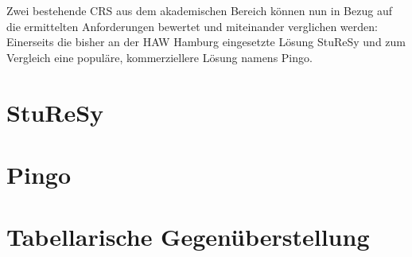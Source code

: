 Zwei bestehende CRS aus dem akademischen Bereich können nun in Bezug auf die ermittelten Anforderungen bewertet und miteinander verglichen werden: Einerseits die bisher an der HAW Hamburg eingesetzte Lösung StuReSy und zum Vergleich eine populäre, kommerziellere Lösung namens Pingo.

\section{StuReSy}
\label{chap:sturesy}


\newpage
\section{Pingo}
\label{chap:pingo}


\newpage
\section{Tabellarische Gegenüberstellung}
\label{chap:tabelle}
